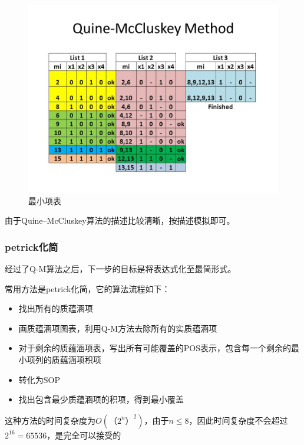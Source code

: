 	\begin{figure}[h]
		\centering
		\includegraphics[scale=0.5]{images/QM.jpg}
		\caption{最小项表}
	\end{figure}
	
	由于Quine–McCluskey算法的描述比较清晰，按描述模拟即可。
	
		

\subsubsection{petrick化简}
	经过了Q-M算法之后，下一步的目标是将表达式化至最简形式。
	
	常用方法是petrick化简，它的算法流程如下：
	\begin{itemize}
		\item	找出所有的质蕴涵项
		\item	画质蕴涵项图表，利用Q-M方法去除所有的实质蕴涵项
		\item	对于剩余的质蕴涵项表，写出所有可能覆盖的POS表示，包含每一个剩余的最小项列的质蕴涵项积项
		\item	转化为SOP
		\item	找出包含最少质蕴涵项的积项，得到最小覆盖
	\end{itemize}
	
	这种方法的时间复杂度为$O(（2^n）^2)$，由于$n \le 8$，因此时间复杂度不会超过$2 ^ {16} = 65536$，是完全可以接受的
	
		
